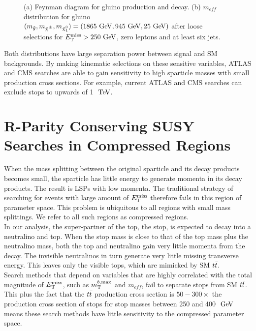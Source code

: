 \begin{figure}[h!]
\begin{center}
\begin{subfigure}[b]{0.45\textwidth}
                \caption{ }
    \end{subfigure}
\end{center}
\caption[Gluino signal with large mass splittings and SM background $m_{eff}$ distribution after loose preliminary selections for $\met>250 \gev$, zero leptons and at least six jets]{ (a) Feynman diagram for gluino production and decay. (b) $m_{eff}$ distribution for gluino $(m_{\gluino}, m_{\chinopm}, m_{\ninoone}) = (1865 \gev, 945 \gev, 25 \gev)$ after loose selections for $\met>250 \gev$, zero leptons and at least six jets.\cite{SUSYinclusive0L} }
\label{fig:gluino_meff} 
\end{figure}

\indent Both distributions have large separation power between signal and SM backgrounds.  By making kinematic selections on these sensitive variables, ATLAS and CMS searches are able to gain sensitivity to high sparticle masses with small production cross sections.  For example, current ATLAS and CMS searches can exclude stops to upwards of 1 $\tev$. \\


\section{R-Parity Conserving SUSY Searches in Compressed Regions}


\indent When the mass splitting between the original sparticle and its decay products becomes small, the sparticle has little energy to generate momenta in its decay products.  The result is LSPs with low momenta.  The traditional strategy of searching for events with large amount of $E_{\mathrm{T}}^{\mathrm{miss}}$ therefore fails in this region of parameter space.  This problem is ubiquitous to all regions with small mass splittings.  We refer to all such regions as compressed regions.  ~\\

\indent  In our analysis, the super-partner of the top, the stop, is expected to decay into a neutralino and top.  When the stop mass is close to that of the top mass plus the neutralino mass, both the top and neutralino gain very little momenta from the decay.  The invisible neutralinos in turn generate very little missing transverse energy.  This leaves only the visible tops, which are mimicked by SM $t\bar{t}$. \\

\indent Search methods that depend on variables that are highly correlated with the total magnitude of $E_{\mathrm{T}}^{\mathrm{miss}}$, such as $m_{\mathrm{T}}^{b,\mathrm{max}}$ and $m_{eff}$, fail to separate stops from SM $t\bar{t}$.  This plus the fact that the $t\bar{t}$ production cross section is $50-300\times$ the production cross section of stops for stop masses between 250 and 400 $\gev$ means these search methods have little sensitivity to the compressed parameter space.  \\ %

